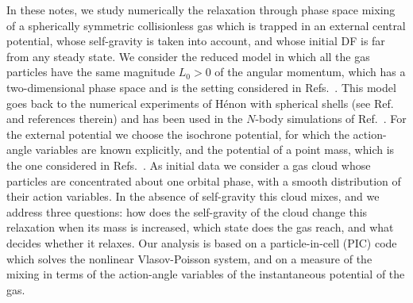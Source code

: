 In these notes, we study numerically the relaxation through phase space mixing of a spherically symmetric collisionless gas which is trapped in an external central potential, whose self-gravity is taken into account, and whose initial DF is far from any steady state. We consider the reduced model in which all the gas particles have the same magnitude $L_0 > 0$ of the angular momentum, which has a two-dimensional phase space and is the setting considered in Refs.~\cite{pRoS20,mHgRmScS25}. This model goes back to the numerical experiments of H\'enon with spherical shells (see Ref.~\cite{mH73} and references therein) and has been used in the $N$-body simulations of Ref.~\cite{pKbM02}. For the external potential we choose the isochrone potential, for which the action-angle variables are known explicitly, and the potential of a point mass, which is the one considered in Refs.~\cite{mHgRmScS25,sCjL26}. As initial data we consider a gas cloud whose particles are concentrated about one orbital phase, with a smooth distribution of their action variables. In the absence of self-gravity this cloud mixes, and we address three questions: how does the self-gravity of the cloud change this relaxation when its mass is increased, which state does the gas reach, and what decides whether it relaxes. Our analysis is based on a particle-in-cell (PIC) code which solves the nonlinear Vlasov-Poisson system, and on a measure of the mixing in terms of the action-angle variables of the instantaneous potential of the gas.

